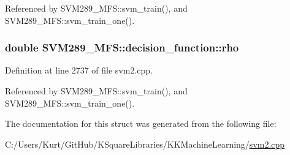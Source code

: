 Referenced by S\+V\+M289\+\_\+\+M\+F\+S\+::svm\+\_\+train(), and S\+V\+M289\+\_\+\+M\+F\+S\+::svm\+\_\+train\+\_\+one().

\subsubsection[{\texorpdfstring{rho}{rho}}]{\setlength{\rightskip}{0pt plus 5cm}double S\+V\+M289\+\_\+\+M\+F\+S\+::decision\+\_\+function\+::rho}\hypertarget{struct_s_v_m289___m_f_s_1_1decision__function_a6d758b106c06798b94311f4a6c498519}{}\label{struct_s_v_m289___m_f_s_1_1decision__function_a6d758b106c06798b94311f4a6c498519}


Definition at line 2737 of file svm2.\+cpp.



Referenced by S\+V\+M289\+\_\+\+M\+F\+S\+::svm\+\_\+train(), and S\+V\+M289\+\_\+\+M\+F\+S\+::svm\+\_\+train\+\_\+one().



The documentation for this struct was generated from the following file\+:\begin{DoxyCompactItemize}
\item 
C\+:/\+Users/\+Kurt/\+Git\+Hub/\+K\+Square\+Libraries/\+K\+K\+Machine\+Learning/\hyperlink{svm2_8cpp}{svm2.\+cpp}\end{DoxyCompactItemize}
